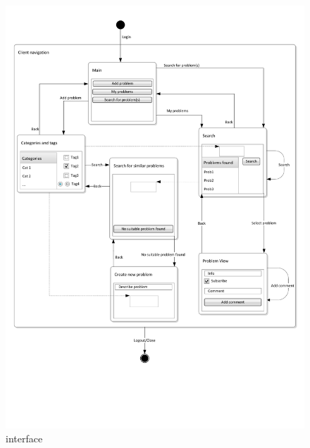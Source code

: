 \begin{figure}[h]
\begin{center}
 \includegraphics[scale=0.70]{input/application_domain_analysis/client_interface}
\caption{\Client[] interface}
\label{fig:client_interface}
\end{center}
\end{figure}

